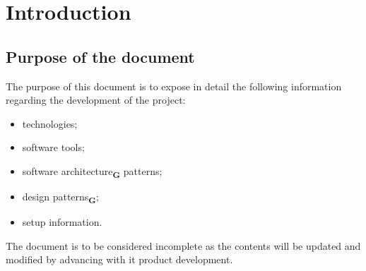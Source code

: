 \section{Introduction}
\subsection{Purpose of the document}
The purpose of this document is to expose in detail the following information regarding the development of the
project:
\begin{itemize}
    \item technologies;
    \item software tools;
    \item software architecture\textsubscript{\textbf{G}} patterns;
    \item design patterns\textsubscript{\textbf{G}};
    \item setup information.
\end{itemize}
The document is to be considered incomplete as the contents will be updated and modified by advancing with it
product development.
